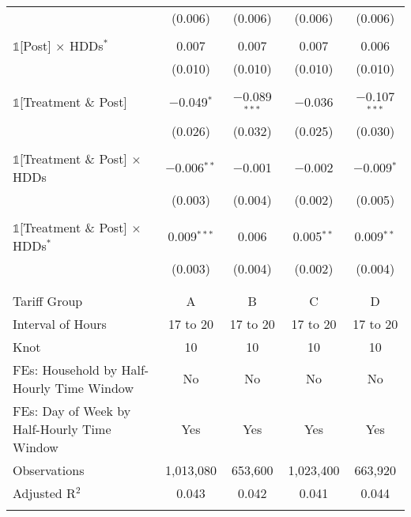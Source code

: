 \begin{table}[!htbp]
\begin{tabular}{@{\extracolsep{30pt}}lcccc}
  & (0.006) & (0.006) & (0.006) & (0.006) \\ 
  & & & & \\ 
 $\mathbb{1}$[Post] $\times$ HDDs$^{*}$ & 0.007 & 0.007 & 0.007 & 0.006 \\ 
  & (0.010) & (0.010) & (0.010) & (0.010) \\ 
  & & & & \\ 
 $\mathbb{1}$[Treatment \& Post] & $-$0.049$^{*}$ & $-$0.089$^{***}$ & $-$0.036 & $-$0.107$^{***}$ \\ 
  & (0.026) & (0.032) & (0.025) & (0.030) \\ 
  & & & & \\ 
 $\mathbb{1}$[Treatment \& Post] $\times$ HDDs & $-$0.006$^{**}$ & $-$0.001 & $-$0.002 & $-$0.009$^{*}$ \\ 
  & (0.003) & (0.004) & (0.002) & (0.005) \\ 
  & & & & \\ 
 $\mathbb{1}$[Treatment \& Post] $\times$ HDDs$^{*}$ & 0.009$^{***}$ & 0.006 & 0.005$^{**}$ & 0.009$^{**}$ \\ 
  & (0.003) & (0.004) & (0.002) & (0.004) \\ 
  & & & & \\ 
\hline \\[-1.8ex] 
Tariff Group & A & B & C & D \\ 
Interval of Hours & 17 to 20 & 17 to 20 & 17 to 20 & 17 to 20 \\ 
Knot & 10 & 10 & 10 & 10 \\ 
FEs: Household by Half-Hourly Time Window & No & No & No & No \\ 
FEs: Day of Week by Half-Hourly Time Window & Yes & Yes & Yes & Yes \\ 
Observations & 1,013,080 & 653,600 & 1,023,400 & 663,920 \\ 
Adjusted R$^{2}$ & 0.043 & 0.042 & 0.041 & 0.044 \\ 
\hline 
\hline \\[-1.8ex] 
\end{tabular} 
\end{table} 
